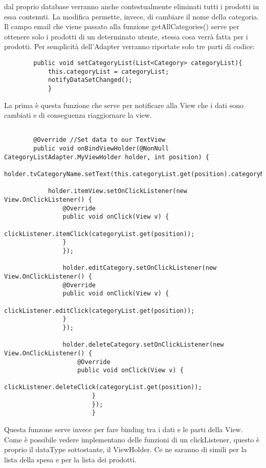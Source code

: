 \documentclass[11pt]{article}
\begin{document}
    dal proprio database verranno anche contestualmente eliminati tutti i prodotti in essa contenuti. La modifica permette,
    invece, di cambiare il nome della categoria. Il campo email che viene passato alla funzione getAllCategories() serve
    per ottenere solo i prodotti di un determinato utente, stessa cosa verrà fatta per i prodotti. 
    Per semplicità dell'Adapter verranno riportate solo tre parti di codice: 
    \begin{lstlisting}
        public void setCategoryList(List<Category> categoryList){
            this.categoryList = categoryList;
            notifyDataSetChanged();
            }
    \end{lstlisting}
    La prima è questa funzione che serve per notificare alla View che i dati sono cambiati e di conseguenza riaggiornare la view.
    \begin{lstlisting}
        
        @Override //Set data to our TextView
        public void onBindViewHolder(@NonNull CategoryListAdapter.MyViewHolder holder, int position) {
            holder.tvCategoryName.setText(this.categoryList.get(position).categoryName);
            
            holder.itemView.setOnClickListener(new View.OnClickListener() {
                @Override
                public void onClick(View v) {
                    clickListener.itemClick(categoryList.get(position));
                }
                });
                
                holder.editCategory.setOnClickListener(new View.OnClickListener() {
                @Override
                public void onClick(View v) {
                    clickListener.editClick(categoryList.get(position));
                }
                });
                
                holder.deleteCategory.setOnClickListener(new View.OnClickListener() {
                    @Override
                    public void onClick(View v) {
                        clickListener.deleteClick(categoryList.get(position));
                        }
                        });
                        }
    \end{lstlisting}    
    Questa funzone serve invece per fare binding tra i dati e le parti della View. Come è possibile vedere
    implementano delle funzioni di un clickListener, questo è proprio il dataType sottostante, il ViewHolder. 
    Ce ne saranno di simili per la lista della spesa e per la lista dei prodotti.
\end{document}
